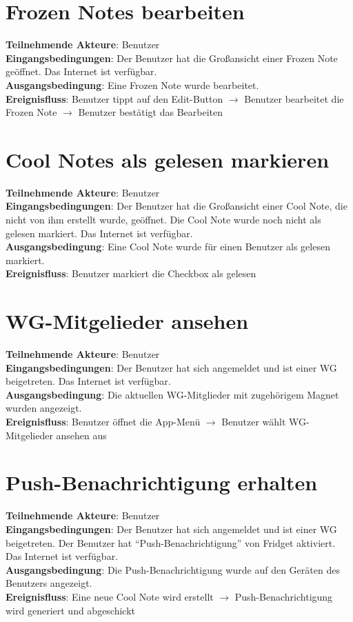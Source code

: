 \documentclass[a4paper]{scrreprt}
\begin{document}
		\section{Frozen Notes bearbeiten}
		\textbf{Teilnehmende Akteure}: Benutzer \\
		\textbf{Eingangsbedingungen}: Der Benutzer hat die Großansicht einer Frozen Note geöffnet. Das Internet ist verfügbar. \\
		\textbf{Ausgangsbedingung}: Eine Frozen Note wurde bearbeitet. \\
		\textbf{Ereignisfluss}: Benutzer tippt auf den Edit-Button $\rightarrow$ Benutzer bearbeitet die Frozen Note $\rightarrow$ Benutzer bestätigt das Bearbeiten
		
		\section{Cool Notes als gelesen markieren}
		\textbf{Teilnehmende Akteure}: Benutzer \\
		\textbf{Eingangsbedingungen}: Der Benutzer hat die Großansicht einer Cool Note, die nicht von ihm erstellt wurde, geöffnet. Die Cool Note wurde noch nicht als gelesen markiert. Das Internet ist verfügbar. \\
		\textbf{Ausgangsbedingung}: Eine Cool Note wurde für einen Benutzer als gelesen markiert. \\
		\textbf{Ereignisfluss}: Benutzer markiert die Checkbox als gelesen
		
		\section{WG-Mitgelieder ansehen}
		\textbf{Teilnehmende Akteure}: Benutzer \\
		\textbf{Eingangsbedingungen}: Der Benutzer hat sich angemeldet und ist einer WG beigetreten. Das Internet ist verfügbar. \\
		\textbf{Ausgangsbedingung}: Die aktuellen WG-Mitglieder mit zugehörigem Magnet wurden angezeigt. \\
     	\textbf{Ereignisfluss}: Benutzer öffnet die App-Menü $\rightarrow$ Benutzer wählt WG-Mitgelieder ansehen aus
		
		\section{Push-Benachrichtigung erhalten}
		\textbf{Teilnehmende Akteure}: Benutzer \\
		\textbf{Eingangsbedingungen}: Der Benutzer hat sich angemeldet und ist einer WG beigetreten. Der Benutzer hat ``Push-Benachrichtigung'' von Fridget aktiviert. Das Internet ist verfügbar. \\
		\textbf{Ausgangsbedingung}: Die Push-Benachrichtigung wurde auf den Geräten des Benutzers angezeigt. \\
		\textbf{Ereignisfluss}: Eine neue Cool Note wird erstellt $\rightarrow$ Push-Benachrichtigung wird generiert und abgeschickt
		
\end{document}
